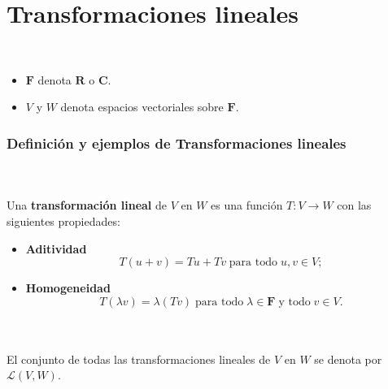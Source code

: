 \chapter{Transformaciones lineales}

\begin{mynotacion}[\boldmath $F,V,W$]\,\\
    \begin{itemize}
	\item $\textbf{F}$ denota $\textbf{R}$ o $\textbf{C}$.
	\item $V$ y $W$ denota espacios vectoriales sobre $\textbf{F}$.
    \end{itemize}
\end{mynotacion}
\vspace{.5cm}

\vspace{.2cm}

\subsection*{Definición y ejemplos de Transformaciones lineales}

\begin{mydef}\;\\\\
	Una \textbf{transformación lineal} de $V$ en $W$ es una función $T:V\to W$ con las siguientes propiedades:

	\begin{itemize}
	    \item \textbf{Aditividad}
		$$T(u+ v)=Tu+ Tv \;\mbox{para todo}\; u,v\in V;$$
	    \item \textbf{Homogeneidad}
		$$T(\lambda v)=\lambda(Tv) \;\mbox{para todo}\; \lambda\in \textbf{F}\; \mbox{y todo}\; v\in V.$$
	\end{itemize}
\end{mydef}

\begin{mynotacion}\; \\\\
    El conjunto de todas las transformaciones lineales de $V$ en $W$ se denota por $\mathcal{L}(V,W)$.
\end{mynotacion}

